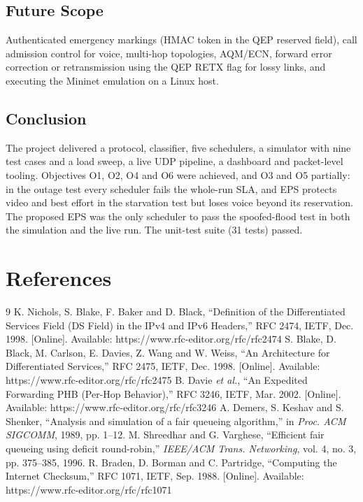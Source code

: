 \documentclass[12pt,a4paper]{article}
\begin{document}
\subsection{Future Scope}
Authenticated emergency markings (HMAC token in the QEP reserved field), call admission control for
voice, multi-hop topologies, AQM/ECN, forward error correction or retransmission using the QEP RETX
flag for lossy links, and executing the Mininet emulation on a Linux host.

\subsection{Conclusion}
The project delivered a protocol, classifier, five schedulers, a simulator with nine test cases and
a load sweep, a live UDP pipeline, a dashboard and packet-level tooling. Objectives O1, O2, O4 and
O6 were achieved, and O3 and O5 partially: in the outage test every scheduler fails the whole-run
SLA, and EPS protects video and best effort in the starvation test but loses voice beyond its
reservation. The proposed EPS was the only scheduler to pass the spoofed-flood test in both the
simulation and the live run. The unit-test suite (31 tests) passed.

\newpage
\section*{References}
\begin{thebibliography}{9}
 K. Nichols, S. Blake, F. Baker and D. Black, ``Definition of the Differentiated Services Field (DS Field) in the IPv4 and IPv6 Headers,'' RFC 2474, IETF, Dec. 1998. [Online]. Available: https://www.rfc-editor.org/rfc/rfc2474
 S. Blake, D. Black, M. Carlson, E. Davies, Z. Wang and W. Weiss, ``An Architecture for Differentiated Services,'' RFC 2475, IETF, Dec. 1998. [Online]. Available: https://www.rfc-editor.org/rfc/rfc2475
 B. Davie \emph{et al.}, ``An Expedited Forwarding PHB (Per-Hop Behavior),'' RFC 3246, IETF, Mar. 2002. [Online]. Available: https://www.rfc-editor.org/rfc/rfc3246
 A. Demers, S. Keshav and S. Shenker, ``Analysis and simulation of a fair queueing algorithm,'' in \emph{Proc. ACM SIGCOMM}, 1989, pp. 1--12.
 M. Shreedhar and G. Varghese, ``Efficient fair queueing using deficit round-robin,'' \emph{IEEE/ACM Trans. Networking}, vol. 4, no. 3, pp. 375--385, 1996.
 R. Braden, D. Borman and C. Partridge, ``Computing the Internet Checksum,'' RFC 1071, IETF, Sep. 1988. [Online]. Available: https://www.rfc-editor.org/rfc/rfc1071
\end{thebibliography}
\end{document}

